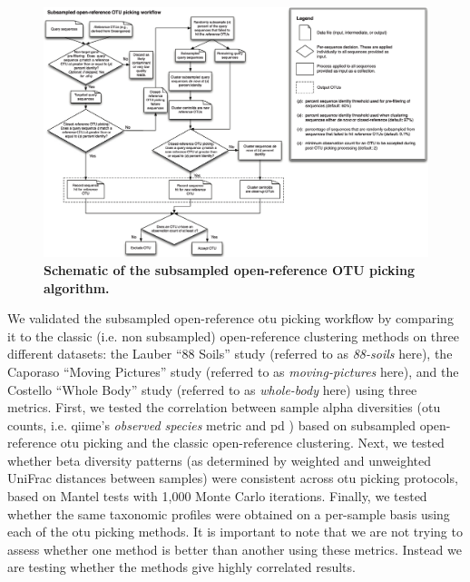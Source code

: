 \begin{figure}[htbp]
\includegraphics[width=\columnwidth]{chapter_otupicking_figures/workflow.png}
\caption[Schematic of the subsampled open-reference OTU picking algorithm]{\textbf{Schematic of the subsampled open-reference OTU picking algorithm.}}
\label{sub_open_ref_fig1}
\end{figure}

We validated the subsampled open-reference \gls{otu} picking workflow by comparing it
to the classic (i.e. non subsampled) open-reference clustering methods on three
different datasets: the Lauber ``88 Soils'' study \cite{Lauber2009} (referred to
as \emph{88-soils} here), the Caporaso ``Moving Pictures'' study \cite{Caporaso2011}
(referred to as \emph{moving-pictures} here), and the Costello ``Whole Body'' study
\cite{Costello2009} (referred to as \emph{whole-body} here) using three metrics.
First, we tested the correlation between sample alpha diversities (\gls{otu} counts,
i.e. \gls{qiime}'s \emph{observed species} metric and \gls{pd} \cite{Faith1992}) based
on subsampled open-reference \gls{otu} picking and the classic open-reference clustering.
Next, we tested whether beta diversity patterns (as determined by weighted and
unweighted UniFrac \cite{Lozupone2005} distances between samples) were consistent across \gls{otu}
picking protocols, based on Mantel tests \cite{Mantel1967} with 1,000 Monte Carlo iterations.
Finally, we tested whether the same taxonomic profiles were obtained on a per-sample
basis using each of the \gls{otu} picking methods. It is important to note that
we are not trying to assess whether one method is better than another using these metrics.
Instead we are testing whether the methods give highly correlated results.

